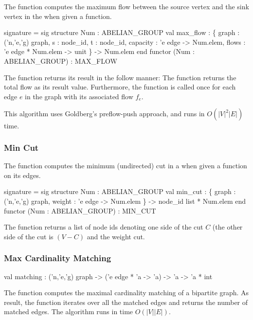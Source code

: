    The function  computes the
maximum flow between the source vertex  and the sink vertex
 in the  when given a  function. 
\begin{SML}
 signature  = sig
   structure Num : ABELIAN_GROUP
   val max_flow : \{ graph    : ('n,'e,'g) graph,
                    s        : node_id, 
                    t        : node_id, 
                    capacity : 'e edge -> Num.elem, 
                    flows    : 'e edge * Num.elem -> unit
                  \} -> Num.elem
 end
 functor (Num : ABELIAN_GROUP) : MAX_FLOW
\end{SML}
The function  returns its result in the follow manner:
The function returns the total flow as its result value.
Furthermore, the function  is called once for each edge $e$ in the
graph with its associated flow $f_e$.  

This algorithm uses Goldberg's preflow-push approach, and runs
in $O(|V|^2|E|)$ time.
\subsubsection{Min Cut}
   The function  computes the
minimum (undirected) cut in a  
when given a  function on
its edges.  
\begin{SML}
 signature  = sig
   structure Num : ABELIAN_GROUP
   val min_cut : \{ graph    : ('n,'e,'g) graph,
                   weight : 'e edge -> Num.elem
                 \} -> node_id list * Num.elem
 end
 functor (Num : ABELIAN_GROUP) : MIN_CUT
\end{SML}
The function  returns a list of node ids denoting
one side of the cut $C$ (the other side of the cut is $(V - C)$ and
the weight cut.

\subsubsection{Max Cardinality Matching}

\begin{SML}
   val matching : ('n,'e,'g) graph -> ('e edge * 'a -> 'a) -> 'a -> 'a * int
\end{SML}

The function  computes the
maximal cardinality matching of a bipartite graph.  As result, 
the function iterates over all the matched edges and returns the
number of matched edges.  The algorithm runs in time $O(|V||E|)$.

